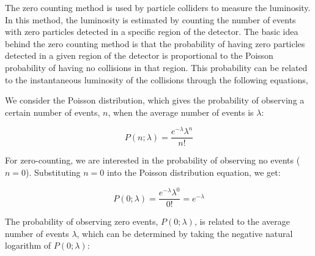 \begin{itemize}
The zero counting method is used by particle colliders to measure the luminosity. In this method, the luminosity is estimated by counting the number of events with zero particles detected in a specific region of the detector. The basic idea behind the zero counting method is that the probability of having zero particles detected in a given region of the detector is proportional to the Poisson probability of having no collisions in that region. This probability can be related to the instantaneous luminosity of the collisions through the following equations,

We consider the Poisson distribution, which gives the probability of observing a certain number of events, $n$, when the average number of events is $\lambda$:

\[
P(n; \lambda) = \frac{e^{-\lambda} \lambda^n}{n!}
\]

For zero-counting, we are interested in the probability of observing no events ($n=0$). Substituting $n=0$ into the Poisson distribution equation, we get:

\[
P(0; \lambda) = \frac{e^{-\lambda} \lambda^0}{0!} = e^{-\lambda}
\]

The probability of observing zero events, $P(0; \lambda)$, is related to the average number of events $\lambda$, which can be determined by taking the negative natural logarithm of $P(0; \lambda)$:


\end{itemize}
